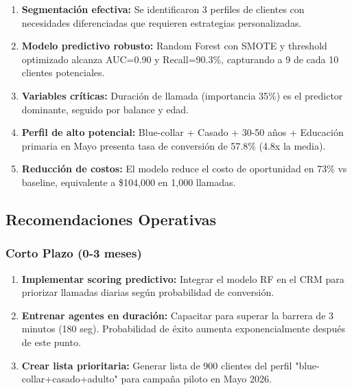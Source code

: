 \documentclass[12pt,letterpaper]{article}
\begin{document}
\begin{enumerate}
    \item \textbf{Segmentación efectiva:} Se identificaron 3 perfiles de clientes con necesidades diferenciadas que requieren estrategias personalizadas.
    
    \item \textbf{Modelo predictivo robusto:} Random Forest con SMOTE y threshold optimizado alcanza AUC=0.90 y Recall=90.3\%, capturando a 9 de cada 10 clientes potenciales.
    
    \item \textbf{Variables críticas:} Duración de llamada (importancia 35\%) es el predictor dominante, seguido por balance y edad.
    
    \item \textbf{Perfil de alto potencial:} Blue-collar + Casado + 30-50 años + Educación primaria en Mayo presenta tasa de conversión de 57.8\% (4.8x la media).
    
    \item \textbf{Reducción de costos:} El modelo reduce el costo de oportunidad en 73\% vs baseline, equivalente a \$104,000 en 1,000 llamadas.
\end{enumerate}

\subsection{Recomendaciones Operativas}

\subsubsection{Corto Plazo (0-3 meses)}

\begin{enumerate}
    \item \textbf{Implementar scoring predictivo:} Integrar el modelo RF en el CRM para priorizar llamadas diarias según probabilidad de conversión.
    
    \item \textbf{Entrenar agentes en duración:} Capacitar para superar la barrera de 3 minutos (180 seg). Probabilidad de éxito aumenta exponencialmente después de este punto.
    
    \item \textbf{Crear lista prioritaria:} Generar lista de 900 clientes del perfil "blue-collar+casado+adulto" para campaña piloto en Mayo 2026.
\end{enumerate}
\end{document}
